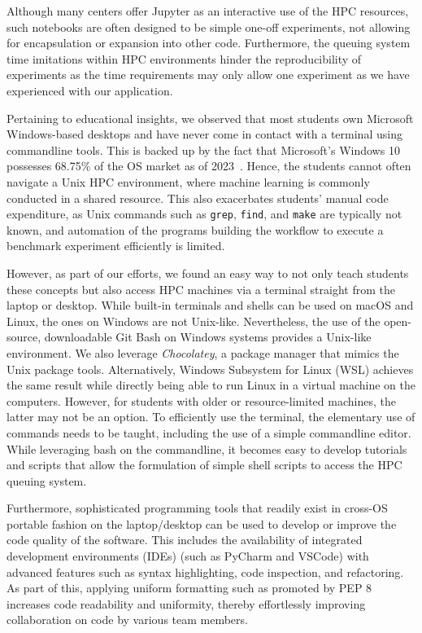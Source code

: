 Although many centers offer Jupyter as an interactive use of the HPC resources, such notebooks are often designed to be simple one-off experiments, not allowing for encapsulation or expansion into other code. Furthermore, the queuing system time imitations within HPC environments hinder the reproducibility of experiments as the time requirements may only allow one experiment as we have experienced with our application.

Pertaining to educational insights, we observed that most students own Microsoft Windows-based desktops and have never come in contact with a terminal using commandline tools. This is backed up by the fact that Microsoft's Windows 10 possesses 68.75\% of the OS market as of 2023~\cite{norem}. Hence, the students cannot often navigate a Unix HPC environment, where machine learning is commonly conducted in a shared resource. This also exacerbates students' manual code expenditure, as Unix commands such as \verb|grep|, \verb|find|, and \verb|make| are typically not known, and automation of the programs building the workflow to execute a benchmark experiment efficiently is limited. 

However, as part of our efforts, we found an easy way to not only teach students these concepts but also access HPC machines via a terminal straight from the laptop or desktop. While built-in terminals and shells can be used on macOS and Linux, the ones on Windows are not Unix-like. Nevertheless, the use of the open-source, downloadable Git Bash on Windows systems provides a Unix-like environment. We also leverage {\em Chocolatey}, a package manager that mimics the Unix package tools. Alternatively, Windows Subsystem for Linux (WSL) achieves the same result while directly being able to run Linux in a virtual machine on the computers. However, for students with older or resource-limited machines, the latter may not be an option. 
To efficiently use the terminal, the elementary use of commands needs to be taught, including the use of a simple commandline editor. While leveraging bash on the commandline, it becomes easy to develop tutorials and scripts that allow the formulation of simple shell scripts to access the HPC queuing system. 

Furthermore, sophisticated programming tools that readily exist in cross-OS portable fashion on the laptop/desktop can be used to develop or improve the code quality of the software. This includes the availability of integrated development environments (IDEs) (such as PyCharm and VSCode) with advanced features such as syntax highlighting, code inspection, and refactoring.  As part of this, applying uniform formatting such as promoted by PEP 8 \cite{www-pep8} increases code readability and uniformity, thereby effortlessly improving collaboration on code by various team members.


